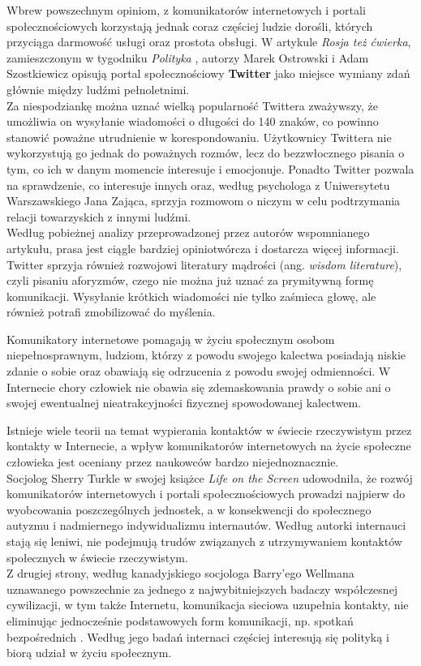 \documentclass[a4paper,12pt]{article}
\begin{document}
\par Wbrew powszechnym opiniom, z komunikatorów internetowych i portali społecznościowych korzystają jednak coraz częściej ludzie dorośli, których przyciąga darmowość usługi oraz prostota obsługi. W artykule \emph{Rosja też ćwierka}, zamieszczonym w tygodniku \emph{Polityka} \cite{PO}, autorzy Marek Ostrowski i Adam Szostkiewicz opisują portal społecznościowy \textbf{Twitter} jako miejsce wymiany zdań głównie między ludźmi pełnoletnimi.\\
Za niespodziankę można uznać wielką popularność Twittera zważywszy, że umożliwia on wysyłanie wiadomości o długości do 140 znaków, co powinno stanowić poważne utrudnienie w korespondowaniu. Użytkownicy Twittera nie wykorzystują go jednak do poważnych rozmów, lecz do bezzwłocznego pisania o tym, co ich w danym momencie interesuje i emocjonuje. Ponadto Twitter pozwala na sprawdzenie, co interesuje innych oraz, według psychologa z Uniwersytetu Warszawskiego Jana Zająca, sprzyja rozmowom o niczym w celu podtrzymania relacji towarzyskich z innymi ludźmi.\\
Według pobieżnej analizy przeprowadzonej przez autorów wspomnianego artykułu, prasa jest ciągle bardziej opiniotwórcza i dostarcza więcej informacji.\\
Twitter sprzyja również rozwojowi literatury mądrości (ang. \textit{wisdom literature}), czyli pisaniu aforyzmów, czego nie można już uznać za prymitywną formę komunikacji. Wysyłanie krótkich wiadomości nie tylko zaśmieca głowę, ale również potrafi zmobilizować do myślenia.

\par Komunikatory internetowe pomagają w życiu społecznym osobom niepełnosprawnym, ludziom, którzy z powodu swojego kalectwa posiadają niskie zdanie o sobie oraz obawiają się odrzucenia z powodu swojej odmienności. W Internecie chory człowiek nie obawia się zdemaskowania prawdy o sobie ani o swojej ewentualnej nieatrakcyjności fizycznej spowodowanej kalectwem.

\par Istnieje wiele teorii na temat wypierania kontaktów w świecie rzeczywistym przez kontakty w Internecie, a wpływ komunikatorów internetowych na życie społeczne człowieka jest oceniany przez naukowców bardzo niejednoznacznie.\\
Socjolog Sherry Turkle w swojej książce \emph{Life on the Screen} \cite{ST} udowodniła, że rozwój komunikatorów internetowych i portali społecznościowych prowadzi najpierw do wyobcowania poszczególnych jednostek, a w konsekwencji do społecznego autyzmu i nadmiernego indywidualizmu internautów.
Według autorki internauci stają się leniwi, nie podejmują trudów związanych z utrzymywaniem kontaktów społecznych w świecie rzeczywistym.\\
Z drugiej strony, według kanadyjskiego socjologa Barry'ego Wellmana uznawanego powszechnie za jednego z najwybitniejszych badaczy współczesnej cywilizacji, w tym także Internetu, komunikacja sieciowa uzupełnia kontakty, nie eliminując jednocześnie podstawowych form komunikacji, np. spotkań bezpośrednich \cite{OU}. Według jego badań internaci częściej interesują się polityką i biorą udział w życiu społecznym.
\end{document}
